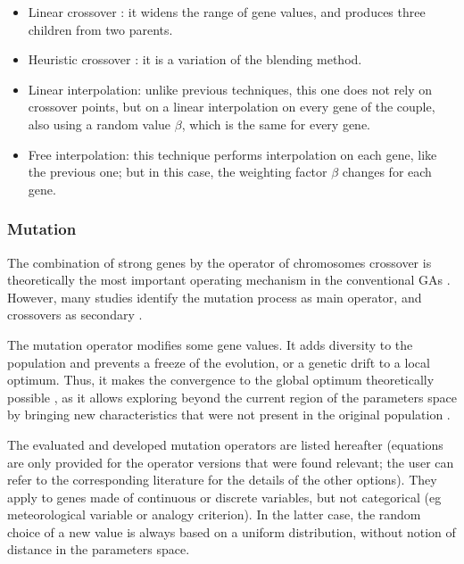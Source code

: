 \documentclass{ametsoc}
\begin{document}
\begin{itemize}
	\item Linear crossover \citep{Wright1991a}: it widens the range of gene values, and produces three children from two parents.
	
	\item Heuristic crossover \citep{Michalewicz1996}: it is a variation of the blending method.
	
	\item Linear interpolation: unlike previous techniques, this one does not rely on crossover points, but on a linear interpolation on every gene of the couple, also using a random value $\beta$, which is the same for every gene.
	
	\item Free interpolation: this technique performs interpolation on each gene, like the previous one; but in this case, the weighting factor $\beta$ changes for each gene.
	
\end{itemize}


\subsubsection{Mutation}
\label{sec:gas:mutation}

The combination of strong genes by the operator of chromosomes crossover is theoretically the most important operating mechanism in the conventional GAs \citep{Holland1992b,Back1993b}. However, many studies identify the mutation process as main operator, and crossovers as secondary \citep[see][]{Back1992a, Back1996a, Back1996b, Smith1997a, Deb1999, Costa2005a, Costa2007a}.

The mutation operator modifies some gene values. It adds diversity to the population and prevents a freeze of the evolution, or a genetic drift to a local optimum. Thus, it makes the convergence to the global optimum theoretically possible \citep{Beasley1993a}, as it allows exploring beyond the current region of the parameters space by bringing new characteristics that were not present in the original population \citep{Haupt2004}. 

The evaluated and developed mutation operators are listed hereafter (equations are only provided for the operator versions that were found relevant; the user can refer to the corresponding literature for the details of the other options). They apply to genes made of continuous or discrete variables, but not categorical (eg meteorological variable or analogy criterion). In the latter case, the random choice of a new value is always based on a uniform distribution, without notion of distance in the parameters space.
\end{document}
